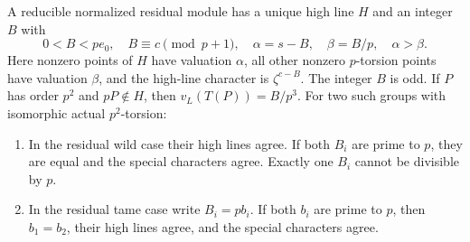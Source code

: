\begin{lemma}
\label{lem:B-RD66-rules}
A reducible normalized residual module has a unique high line $H$
and an integer $B$ with
\[
 0<B<pe_0,\quad B\equiv c\pmod{p+1},\quad
 \alpha=s-B,\quad\beta=B/p,\quad\alpha>\beta.          \tag{B-RD66.2}
\]
Here nonzero points of $H$ have valuation $\alpha$, all other
nonzero $p$-torsion points have valuation $\beta$, and the high-line
character is $\zeta^{c-B}$. The integer $B$ is odd. If $P$ has
order $p^2$ and $pP\notin H$, then $v_L(T(P))=B/p^3$.
For two such groups with isomorphic actual $p^2$-torsion:
\begin{enumerate}
\item In the residual wild case their high lines agree. If both $B_i$
are prime to $p$, they are equal and the special characters agree.
Exactly one $B_i$ cannot be divisible by $p$.
\item In the residual tame case write $B_i=pb_i$. If both $b_i$ are
prime to $p$, then $b_1=b_2$, their high lines agree, and the special
characters agree.
\end{enumerate}
\end{lemma}

